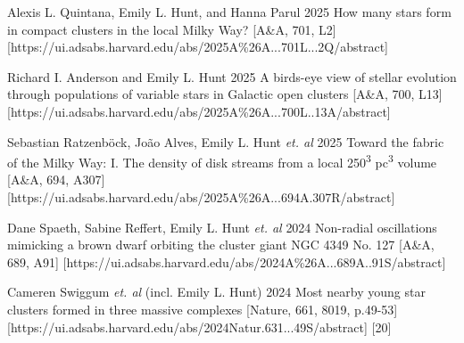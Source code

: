 \begin{etaremune}
    \item \publication 
        {Alexis L. Quintana, Emily L. Hunt, and Hanna Parul}
        {2025}
        {How many stars form in compact clusters in the local Milky Way?}
        [A\&A, 701, L2]
        [https://ui.adsabs.harvard.edu/abs/2025A\%26A...701L...2Q/abstract]
    \item \publication 
        {Richard I. Anderson and Emily L. Hunt}
        {2025}
        {A birds-eye view of stellar evolution through populations of variable stars in Galactic open clusters}
        [A\&A, 700, L13]
        [https://ui.adsabs.harvard.edu/abs/2025A\%26A...700L..13A/abstract]
    \item \publication 
        {Sebastian Ratzenböck, João Alves, Emily L. Hunt \emph{et. al}}
        {2025}
        {Toward the fabric of the Milky Way: I. The density of disk streams from a local 250\textsuperscript{3} pc\textsuperscript{3} volume}
        [A\&A, 694, A307]
        [https://ui.adsabs.harvard.edu/abs/2025A\%26A...694A.307R/abstract]
    \item \publication
        {Dane Spaeth, Sabine Reffert, Emily L. Hunt \emph{et. al}}
        {2024}
        {Non-radial oscillations mimicking a brown dwarf orbiting the cluster giant NGC 4349 No. 127}
        [A\&A, 689, A91]
        [https://ui.adsabs.harvard.edu/abs/2024A\%26A...689A..91S/abstract]
    \item \publication
        {Cameren Swiggum \emph{et. al} (incl. Emily L. Hunt)}
        {2024}
        {Most nearby young star clusters formed in three massive complexes }
        [Nature, 661, 8019, p.49-53]
        [https://ui.adsabs.harvard.edu/abs/2024Natur.631...49S/abstract]
        [20]
\end{etaremune}

